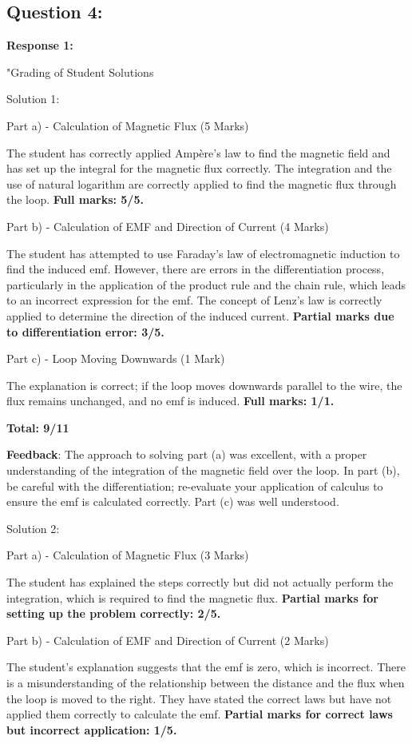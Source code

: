 \documentclass[a4paper,11pt]{article}
\begin{document}
\subsection*{Question 4:}

\textbf{Response 1:}

"Grading of Student Solutions

Solution 1:

Part a) - Calculation of Magnetic Flux (5 Marks)

The student has correctly applied Ampère's law to find the magnetic field and has set up the integral for the magnetic flux correctly. The integration and the use of natural logarithm are correctly applied to find the magnetic flux through the loop. \textbf{Full marks: 5/5.}

Part b) - Calculation of EMF and Direction of Current (4 Marks)

The student has attempted to use Faraday's law of electromagnetic induction to find the induced emf. However, there are errors in the differentiation process, particularly in the application of the product rule and the chain rule, which leads to an incorrect expression for the emf. The concept of Lenz's law is correctly applied to determine the direction of the induced current. \textbf{Partial marks due to differentiation error: 3/5.}

Part c) - Loop Moving Downwards (1 Mark)

The explanation is correct; if the loop moves downwards parallel to the wire, the flux remains unchanged, and no emf is induced. \textbf{Full marks: 1/1.}

\textbf{Total: 9/11}

\textbf{Feedback}: The approach to solving part (a) was excellent, with a proper understanding of the integration of the magnetic field over the loop. In part (b), be careful with the differentiation; re-evaluate your application of calculus to ensure the emf is calculated correctly. Part (c) was well understood.

Solution 2:

Part a) - Calculation of Magnetic Flux (3 Marks)

The student has explained the steps correctly but did not actually perform the integration, which is required to find the magnetic flux. \textbf{Partial marks for setting up the problem correctly: 2/5.}

Part b) - Calculation of EMF and Direction of Current (2 Marks)

The student's explanation suggests that the emf is zero, which is incorrect. There is a misunderstanding of the relationship between the distance and the flux when the loop is moved to the right. They have stated the correct laws but have not applied them correctly to calculate the emf. \textbf{Partial marks for correct laws but incorrect application: 1/5.}
\end{document}
